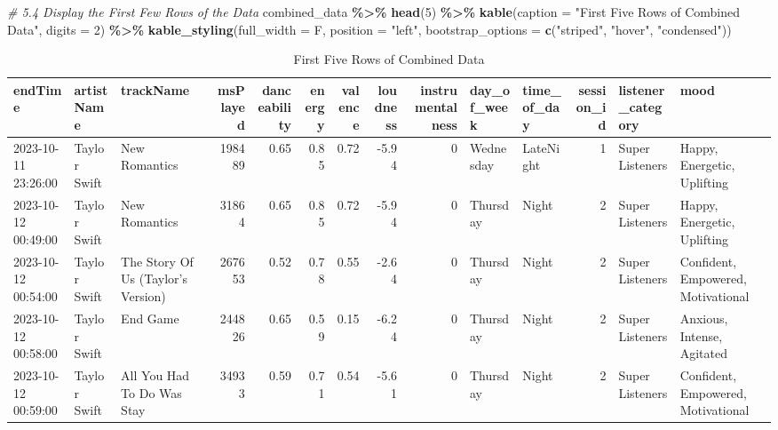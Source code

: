 \documentclass[
]{article}
\newenvironment{Shaded}{\begin{snugshade}}{\end{snugshade}}
\newcommand{\AttributeTok}[1]{\textcolor[rgb]{0.13,0.29,0.53}{#1}}
\newcommand{\CommentTok}[1]{\textcolor[rgb]{0.56,0.35,0.01}{\textit{#1}}}
\newcommand{\DecValTok}[1]{\textcolor[rgb]{0.00,0.00,0.81}{#1}}
\newcommand{\FunctionTok}[1]{\textcolor[rgb]{0.13,0.29,0.53}{\textbf{#1}}}
\newcommand{\NormalTok}[1]{#1}
\newcommand{\SpecialCharTok}[1]{\textcolor[rgb]{0.81,0.36,0.00}{\textbf{#1}}}
\newcommand{\StringTok}[1]{\textcolor[rgb]{0.31,0.60,0.02}{#1}}
\begin{document}
\begin{Shaded}
\begin{Highlighting}[]
\CommentTok{\# 5.4 Display the First Few Rows of the Data}
\NormalTok{combined\_data }\SpecialCharTok{\%\textgreater{}\%}
  \FunctionTok{head}\NormalTok{(}\DecValTok{5}\NormalTok{) }\SpecialCharTok{\%\textgreater{}\%}
  \FunctionTok{kable}\NormalTok{(}\AttributeTok{caption =} \StringTok{"First Five Rows of Combined Data"}\NormalTok{, }\AttributeTok{digits =} \DecValTok{2}\NormalTok{) }\SpecialCharTok{\%\textgreater{}\%}
  \FunctionTok{kable\_styling}\NormalTok{(}\AttributeTok{full\_width =}\NormalTok{ F, }\AttributeTok{position =} \StringTok{"left"}\NormalTok{, }\AttributeTok{bootstrap\_options =} \FunctionTok{c}\NormalTok{(}\StringTok{"striped"}\NormalTok{, }\StringTok{"hover"}\NormalTok{, }\StringTok{"condensed"}\NormalTok{))}
\end{Highlighting}
\end{Shaded}

\begin{longtable}[l]{lllrrrrrrllrll}
\caption{\label{tab:unnamed-chunk-10}First Five Rows of Combined Data}\\
\toprule
endTime & artistName & trackName & msPlayed & danceability & energy & valence & loudness & instrumentalness & day\_of\_week & time\_of\_day & session\_id & listener\_category & mood\\
\midrule
2023-10-11 23:26:00 & Taylor Swift & New Romantics & 198489 & 0.65 & 0.85 & 0.72 & -5.94 & 0 & Wednesday & LateNight & 1 & Super Listeners & Happy, Energetic, Uplifting\\
2023-10-12 00:49:00 & Taylor Swift & New Romantics & 31864 & 0.65 & 0.85 & 0.72 & -5.94 & 0 & Thursday & Night & 2 & Super Listeners & Happy, Energetic, Uplifting\\
2023-10-12 00:54:00 & Taylor Swift & The Story Of Us (Taylor's Version) & 267653 & 0.52 & 0.78 & 0.55 & -2.64 & 0 & Thursday & Night & 2 & Super Listeners & Confident, Empowered, Motivational\\
2023-10-12 00:58:00 & Taylor Swift & End Game & 244826 & 0.65 & 0.59 & 0.15 & -6.24 & 0 & Thursday & Night & 2 & Super Listeners & Anxious, Intense, Agitated\\
2023-10-12 00:59:00 & Taylor Swift & All You Had To Do Was Stay & 34933 & 0.59 & 0.71 & 0.54 & -5.61 & 0 & Thursday & Night & 2 & Super Listeners & Confident, Empowered, Motivational\\
\bottomrule
\end{longtable}
\end{document}
